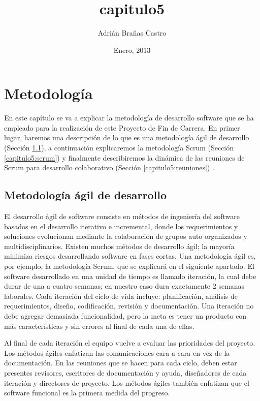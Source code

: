 \title{capitulo5} 
\author{Adrián Brañas Castro}
\date{\Large Enero, 2013} 

\chapter {Metodología}
\label{capitulo5}

En este capítulo se va a explicar la metodología de desarrollo software que se ha empleado para la realización de este Proyecto de Fin de Carrera. En primer lugar, haremos una descripción de lo que es una metodología ágil de desarrollo (Sección \ref{capitulo5:metodologia}), a continuación explicaremos la metodología Scrum (Sección \ref{capitulo5:scrum}) y finalmente describiremos la dinámica de las reuniones de Scrum para desarrollo colaborativo (Sección \ref{capitulo5:reuniones}) .

\section{Metodología ágil de desarrollo}
\label{capitulo5:metodologia}
El desarrollo ágil de software consiste en métodos de ingeniería del software basados en el desarrollo iterativo e incremental, donde los requerimientos y soluciones evolucionan mediante la colaboración de grupos auto organizados y multidisciplinarios. Existen muchos métodos de desarrollo ágil; la mayoría minimiza riesgos desarrollando software en fases cortas. Una metodología ágil es, por ejemplo, la metodología Scrum, que se explicará en el siguiente apartado. El software desarrollado en una unidad de tiempo es llamado iteración, la cual debe durar de una a cuatro semanas; en nuestro caso dura exactamente 2 semanas laborales. Cada iteración del ciclo de vida incluye: planificación, análisis de requerimientos, diseño, codificación, revisión y documentación. Una iteración no debe agregar demasiada funcionalidad, pero la meta es tener un producto con más características y sin errores al final de cada una de ellas. 

Al final de cada iteración el equipo vuelve a evaluar las prioridades del proyecto.
Los métodos ágiles enfatizan las comunicaciones cara a cara en vez de la documentación. En las reuniones que se hacen para cada ciclo, deben estar presentes revisores, escritores de documentación y ayuda, diseñadores de cada iteración y directores de proyecto. Los métodos ágiles también enfatizan que el software funcional es la primera medida del progreso.

